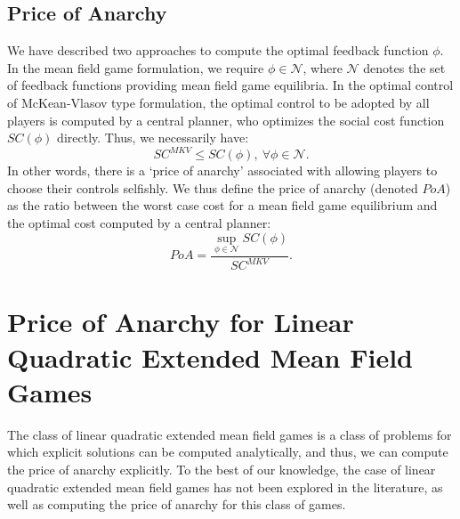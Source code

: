 \documentclass[11pt]{article}
\begin{document}
\subsection{\textbf{Price of Anarchy}}\label{Price_Of_Anarchy}
We have described two approaches to compute the optimal feedback function $\phi$. In the mean field game formulation, we require $\phi \in \mathcal{N}$, where $\mathcal{N}$ denotes the set of feedback functions providing mean field game equilibria. In the optimal control of McKean-Vlasov type formulation, the optimal control to be adopted by all players is computed by a central planner, who optimizes the social cost function $SC(\phi)$ directly. Thus, we necessarily have:
\begin{equation*}
    SC^{MKV} \leq SC(\phi),\ \forall \phi \in \mathcal{N}.
\end{equation*}
In other words, there is a `price of anarchy' associated with allowing players to choose their controls selfishly. We thus define the price of anarchy (denoted $PoA$) as the ratio between the worst case cost for a mean field game equilibrium and the optimal cost computed by a central planner:
\begin{equation*}
    PoA=\frac{\sup_{\phi \in \mathcal{N}}SC(\phi)}{SC^{MKV}}.
\end{equation*}

\section{\textbf{Price of Anarchy for Linear Quadratic Extended Mean Field Games}}\label{sec:PoA_LQ}
The class of linear quadratic extended mean field games is a class of problems for which explicit solutions can be computed analytically, and thus, we can compute the price of anarchy explicitly. To the best of our knowledge, the case of linear quadratic extended mean field games has not been explored in the literature, as well as computing the price of anarchy for this class of games.
\end{document}
